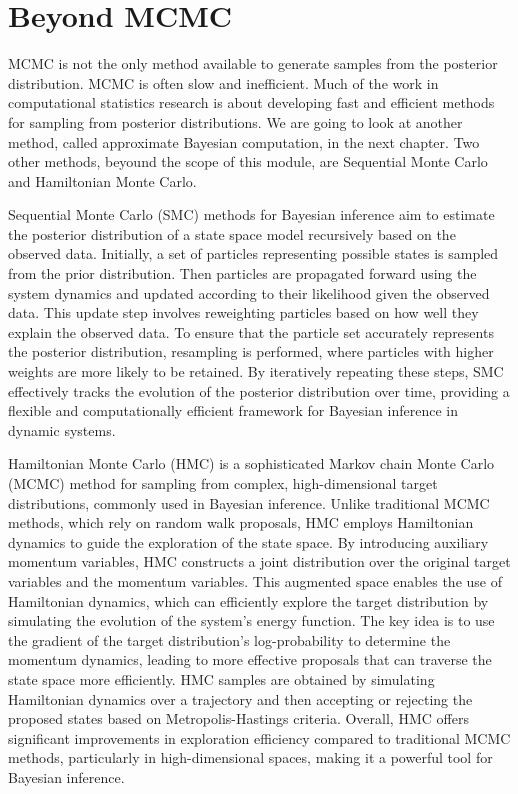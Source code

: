 \documentclass[
]{book}
\theoremstyle{definition}
\theoremstyle{definition}
\theoremstyle{definition}
\theoremstyle{definition}
\theoremstyle{remark}
\begin{document}
\hypertarget{beyond-mcmc}{%
\section{Beyond MCMC}\label{beyond-mcmc}}

MCMC is not the only method available to generate samples from the posterior distribution. MCMC is often slow and inefficient. Much of the work in computational statistics research is about developing fast and efficient methods for sampling from posterior distributions. We are going to look at another method, called approximate Bayesian computation, in the next chapter. Two other methods, beyound the scope of this module, are Sequential Monte Carlo and Hamiltonian Monte Carlo.

Sequential Monte Carlo (SMC) methods for Bayesian inference aim to estimate the posterior distribution of a state space model recursively based on the observed data. Initially, a set of particles representing possible states is sampled from the prior distribution. Then particles are propagated forward using the system dynamics and updated according to their likelihood given the observed data. This update step involves reweighting particles based on how well they explain the observed data. To ensure that the particle set accurately represents the posterior distribution, resampling is performed, where particles with higher weights are more likely to be retained. By iteratively repeating these steps, SMC effectively tracks the evolution of the posterior distribution over time, providing a flexible and computationally efficient framework for Bayesian inference in dynamic systems.

Hamiltonian Monte Carlo (HMC) is a sophisticated Markov chain Monte Carlo (MCMC) method for sampling from complex, high-dimensional target distributions, commonly used in Bayesian inference. Unlike traditional MCMC methods, which rely on random walk proposals, HMC employs Hamiltonian dynamics to guide the exploration of the state space. By introducing auxiliary momentum variables, HMC constructs a joint distribution over the original target variables and the momentum variables. This augmented space enables the use of Hamiltonian dynamics, which can efficiently explore the target distribution by simulating the evolution of the system's energy function. The key idea is to use the gradient of the target distribution's log-probability to determine the momentum dynamics, leading to more effective proposals that can traverse the state space more efficiently. HMC samples are obtained by simulating Hamiltonian dynamics over a trajectory and then accepting or rejecting the proposed states based on Metropolis-Hastings criteria. Overall, HMC offers significant improvements in exploration efficiency compared to traditional MCMC methods, particularly in high-dimensional spaces, making it a powerful tool for Bayesian inference.
\end{document}

